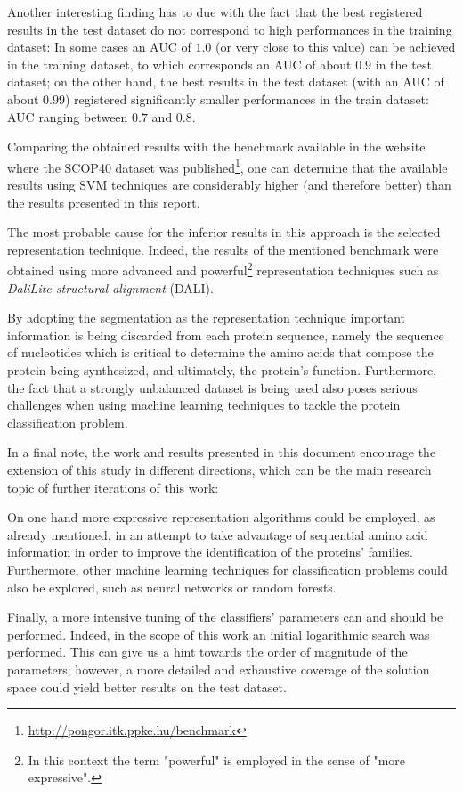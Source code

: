 \documentclass[11pt]{article}
\begin{document}
Another interesting finding has to due with the fact that the best registered results in the test dataset do not correspond to high performances in the training dataset: In some cases an AUC of $1.0$ (or very close to this value) can be achieved in the training dataset, to which corresponds an AUC of about $0.9$ in the test dataset; on the other hand, the best results in the test dataset (with an AUC of about $0.99$) registered significantly smaller performances in the train dataset: AUC ranging between $0.7$ and $0.8$.

Comparing the obtained results with the benchmark available in the website where the SCOP40 dataset was published\footnote{\url{http://pongor.itk.ppke.hu/benchmark}}, one can determine that the available results using SVM techniques are considerably higher (and therefore better) than the results presented in this report.

The most probable cause for the inferior results in this approach is the selected representation technique. Indeed, the results of the mentioned benchmark were obtained using more advanced and powerful\footnote{In this context the term "powerful" is employed in the sense of "more expressive".} representation techniques such as \emph{DaliLite structural alignment} (DALI).

By adopting the segmentation as the representation technique important information is being discarded from each protein sequence, namely the sequence of nucleotides which is critical to determine the amino acids that compose the protein being synthesized, and ultimately, the protein's function. Furthermore, the fact that a strongly unbalanced dataset is being used also poses serious challenges when using machine learning techniques to tackle the protein classification problem.

In a final note, the work and results presented in this document encourage the extension of this study in different directions, which can be the main research topic of further iterations of this work:

On one hand more expressive representation algorithms could be employed, as already mentioned, in an attempt to take advantage of sequential amino acid information in order to improve the identification of the proteins' families. Furthermore, other machine learning techniques for classification problems could also be explored, such as neural networks or random forests.

Finally, a more intensive tuning of the classifiers' parameters can and should be performed. Indeed, in the scope of this work an initial logarithmic search was performed. This can give us a hint towards the order of magnitude of the parameters; however, a more detailed and exhaustive coverage of the solution space could yield better results on the test dataset.



\end{document}
